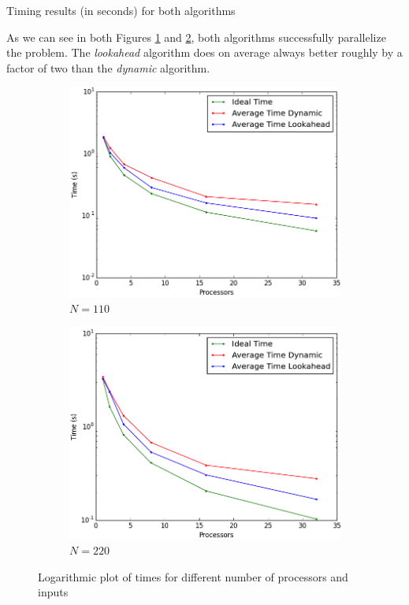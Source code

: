 \documentclass[letterpaper,twoside,11pt]{article}
\begin{document}
\begin{multicols}{2}
\begin{table}[H]
    \caption{Timing results (in seconds) for both algorithms }
    \label{tab:Times}
\end{table}

As we can see in both Figures \ref{fig:times110} and \ref{fig:times220}, both algorithms successfully parallelize the problem. The \emph{lookahead} algorithm does on average always better roughly by a factor of two than the \emph{dynamic} algorithm.

\begin{figure}
  \centering
  \begin{subfigure}{.5\textwidth}
    \centering
    \includegraphics[width=.93\textwidth]{../3 Analysis/time_110.png}
    \caption{$N = 110$}
    \label{fig:times110}
  \end{subfigure}%
  \begin{subfigure}{.5\textwidth}
    \centering
    \includegraphics[width=.93\textwidth]{../3 Analysis/time_220.png}
    \caption{$N = 220$}
    \label{fig:times220}
  \end{subfigure}
  \caption{Logarithmic plot of times for different number of processors and inputs}
  \label{fig:times}
\end{figure}


\end{multicols}
\end{document}
